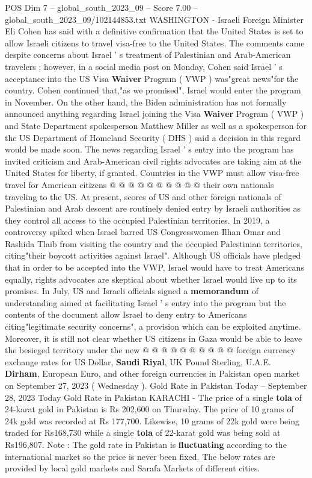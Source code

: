 \begin{textsample}{POS Dim 7 – global\_south\_2023\_09 – Score 7.00 – global\_south\_2023\_09/102144853.txt}  \label{ex:f7_pos_002}
WASHINGTON - Israeli Foreign Minister Eli Cohen has said with a definitive confirmation that the United States is set to allow Israeli citizens to travel visa-free to the United States.
The comments came despite concerns about Israel ' s treatment of Palestinian and Arab-American travelers ; however, in a social media post on Monday, Cohen said Israel ' s acceptance into the US Visa \textbf{Waiver} Program ( VWP ) was"great news"for the country.
Cohen continued that,"as we promised", Israel would enter the program in November.
On the other hand, the Biden administration has not formally announced anything regarding Israel joining the Visa \textbf{Waiver} Program ( VWP ) and State Department spokesperson Matthew Miller as well as a spokesperson for the US Department of Homeland Security ( DHS ) said a decision in this regard would be made soon.
The news regarding Israel ' s entry into the program has invited criticism and Arab-American civil rights advocates are taking aim at the United States for liberty, if granted.
Countries in the VWP must allow visa-free travel for American citizens @ @ @ @ @ @ @ @ @ @ their own nationals traveling to the US.
At present, scores of US and other foreign nationals of Palestinian and Arab descent are routinely denied entry by Israeli authorities as they control all access to the occupied Palestinian territories.
In 2019, a controversy spiked when Israel barred US Congresswomen Ilhan Omar and Rashida Tlaib from visiting the country and the occupied Palestinian territories, citing"their boycott activities against Israel".
Although US officials have pledged that in order to be accepted into the VWP, Israel would have to treat Americans equally, rights advocates are skeptical about whether Israel would live up to its promises.
In July, US and Israeli officials signed a \textbf{memorandum} of understanding aimed at facilitating Israel ' s entry into the program but the contents of the document allow Israel to deny entry to Americans citing"legitimate security concerns", a provision which can be exploited anytime.
Moreover, it is still not clear whether US citizens in Gaza would be able to leave the besieged territory under the new @ @ @ @ @ @ @ @ @ @ foreign currency exchange rates for US Dollar, \textbf{Saudi} \textbf{Riyal}, UK Pound Sterling, U.A.E. \textbf{Dirham}, European Euro, and other foreign currencies in Pakistan open market on September 27, 2023 ( Wednesday ).
Gold Rate in Pakistan Today -- September 28, 2023 Today Gold Rate in Pakistan KARACHI - The price of a single \textbf{tola} of 24-karat gold in Pakistan is Rs 202,600 on Thursday.
The price of 10 grams of 24k gold was recorded at Rs 177,700.
Likewise, 10 grams of 22k gold were being traded for Rs168,730 while a single \textbf{tola} of 22-karat gold was being sold at Rs196,807.
Note : The gold rate in Pakistan is \textbf{fluctuating} according to the international market so the price is never been fixed.
The below rates are provided by local gold markets and Sarafa Markets of different cities.

\end{textsample}
